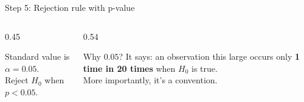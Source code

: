 \documentclass[9pt,english,aspectratio=169]{beamer}
\begin{document}
%
\begin{frame}{Step 5: Rejection rule with p-value}

  \vspace{0.2em}
  \begin{center}
  \end{center}

  \vspace{0.4em}
  \begin{columns}[T]
    \begin{column}{0.45\textwidth}
      \vspace{0.2em}
      \begin{methodbox}
        Standard value is $\alpha = \mathbf{0.05}$. \\[0.3em]
        Reject $H_0$ when $p < 0.05$. 
      \end{methodbox}
    \end{column}
    \pause 
    \begin{column}{0.54\textwidth}
      \vspace{0.2em}
      \begin{insightbox}
        Why $0.05$? It says: an observation this large occurs only \textbf{1 time in 20 times} when $H_0$ is true. \\[0.3em]
        More importantly, it's a convention.
      \end{insightbox}
    \end{column}
  \end{columns}

\end{frame}
\end{document}
